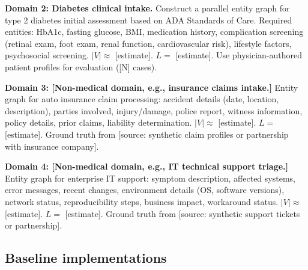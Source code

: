 \documentclass[11pt,a4paper]{article}
\newcommand{\placeholder}[1]{%
  \begin{tcolorbox}[colback=yellow!10,colframe=orange!60!black,
    fonttitle=\bfseries,title=Placeholder]
    #1
  \end{tcolorbox}%
}
\begin{document}
\placeholder{%
  \textbf{Domain 2: Diabetes clinical intake.}
  Construct a parallel entity graph for type 2 diabetes initial assessment
  based on ADA Standards of Care. Required entities: HbA1c, fasting glucose,
  BMI, medication history, complication screening (retinal exam, foot exam,
  renal function, cardiovascular risk), lifestyle factors, psychosocial
  screening. $|V| \approx $ [estimate]. $L = $ [estimate].
  Use physician-authored patient profiles for evaluation ([N] cases).
}

\placeholder{%
  \textbf{Domain 3: [Non-medical domain, e.g., insurance claims intake.]}
  Entity graph for auto insurance claim processing: accident details (date,
  location, description), parties involved, injury/damage, police report,
  witness information, policy details, prior claims, liability determination.
  $|V| \approx $ [estimate]. $L = $ [estimate].
  Ground truth from [source: synthetic claim profiles or partnership with
  insurance company].
}

\placeholder{%
  \textbf{Domain 4: [Non-medical domain, e.g., IT technical support triage.]}
  Entity graph for enterprise IT support: symptom description, affected
  systems, error messages, recent changes, environment details (OS, software
  versions), network status, reproducibility steps, business impact,
  workaround status. $|V| \approx $ [estimate]. $L = $ [estimate].
  Ground truth from [source: synthetic support tickets or partnership].
}

\begin{table}[!htbp]
\centering
\caption{Graph structural characteristics across evaluation domains.}
\label{tab:graph_structure}
\small

\end{table}

\subsection{Baseline implementations}
\label{sec:methods_baselines}
\end{document}
